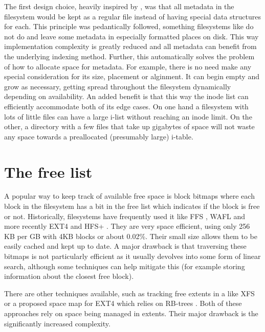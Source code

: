         The first design choice, heavily inspired by , was
        that all metadata in the filesystem would be kept as a regular file
        instead of having special data structures for each. This principle was
        pedantically followed, something filesystems like 
        do not do and leave some metadata in especially formatted places on
        disk. This way implementation complexity is greatly reduced and all
        metadata can benefit from the underlying indexing method. Further, this
        automatically solves the problem of how to allocate space for metadata.
        For example, there is no need make any special consideration for its
        size, placement or alginment. It can begin empty and grow as necessary,
        getting spread throughout the filesystem dynamically depending on
        availability. An added benefit is that this way the inode list can
        efficiently accommodate both of its edge cases. On one hand a
        filesystem with lots of little files can have a large i-list without
        reaching an inode limit. On the other, a directory with a few files
        that take up gigabytes of space will not waste any space towards a
        preallocated (presumably large) i-table.

    \section{The free list}
        \label{sec:free_list}

        A popular way to keep track of available free space is block bitmaps
        where each block in the filesystem has a bit in the free list which
        indicates if the block is free or not. Historically, filesystems have
        frequently used it like FFS \cite{FFS}, WAFL \cite{WAFL} and more
        recently EXT4 \cite{ext4_space_maps} and HFS+ \cite{HFSplus}. They are
        very space efficient, using only 256 KB per GB with 4KB blocks or about
        0.02\%. Their small size allows them to be easily cached and kept up to
        date. A major drawback is that traversing these bitmaps is not
        particularly efficient as it usually devolves into some form of linear
        search, although some techniques can help mitigate this (for example
        storing information about the closest free block).

        There are other techniques available, such as tracking free extents in
        a \bplustree like XFS \cite{XFS_scalability} or a proposed space map
        for EXT4 which relies on RB-trees \cite{ext4_space_maps}. Both of these
        approaches rely on space being managed in extents. Their major drawback is
        the significantly increased complexity.

